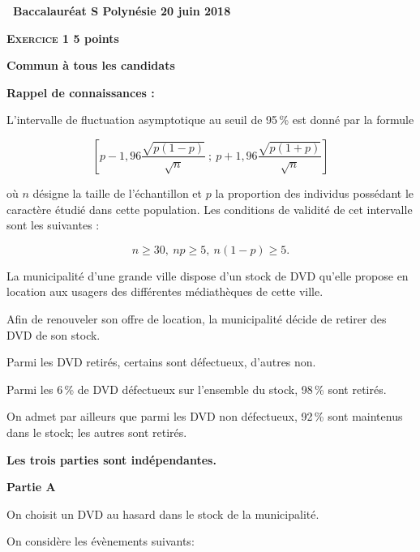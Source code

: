 \documentclass[10pt,a4paper]{article}
\begin{document}
\label{Polynesie}
\pagestyle{fancy}
\thispagestyle{empty} 

\begin{center} {\Large{\textbf{\decofourleft~Baccalauréat S Polynésie 20 juin 2018~\decofourright}}}
\end{center}

\vspace{0,5cm}

\textbf{\textsc{Exercice 1} \hfill 5 points}
 
\textbf{Commun à tous les candidats}

\medskip

\textbf{Rappel de connaissances :}

\medskip

L'intervalle de fluctuation asymptotique au seuil de 95\,\% est donné par la formule

\[\left[p- 1,96\dfrac{\sqrt{p(1 - p)}}{\sqrt{n}}~;~p + 1,96\dfrac{\sqrt{p(1 + p)}}{\sqrt{n}}\right]\]

où $n$ désigne la taille de l'échantillon et $p$ la proportion des individus possédant le caractère étudié dans cette population. Les conditions de validité de cet intervalle sont les suivantes :

\[n \geqslant 30,\: np \geqslant 5,\: n(1 - p) \geqslant 5.\]

La municipalité d'une grande ville dispose d'un stock de DVD qu'elle propose en location aux usagers des différentes médiathèques de cette ville.

Afin de renouveler son offre de location, la municipalité décide de retirer des DVD de son stock.

Parmi les DVD retirés, certains sont défectueux, d'autres non.

Parmi les 6\,\% de DVD défectueux sur l'ensemble du stock, 98\,\% sont retirés.

On admet par ailleurs que parmi les DVD non défectueux, 92\,\% sont maintenus dans le stock; les autres sont retirés.

\medskip

\textbf{Les trois parties sont indépendantes.}

\bigskip

\textbf{Partie A}

\medskip

On choisit un DVD au hasard dans le stock de la municipalité.

On considère les évènements suivants:
\end{document}

